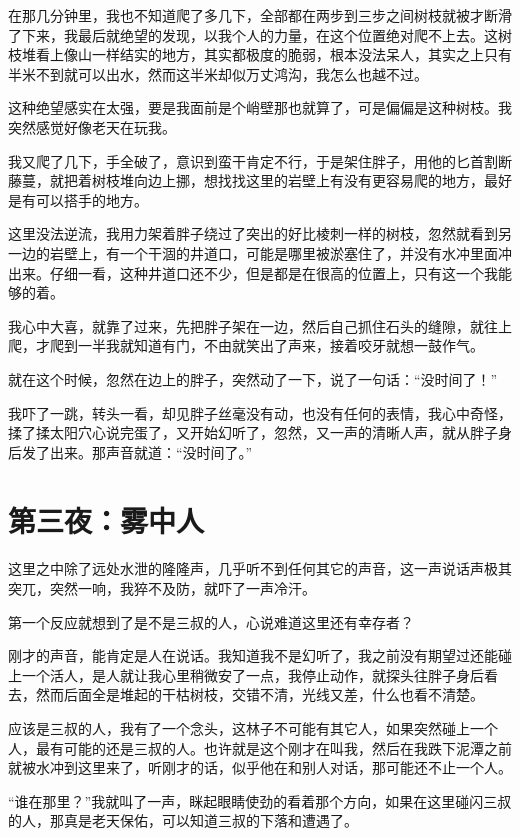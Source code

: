在那几分钟里，我也不知道爬了多几下，全部都在两步到三步之间树枝就被才断滑了下来，我最后就绝望的发现，以我个人的力量，在这个位置绝对爬不上去。这树枝堆看上像山一样结实的地方，其实都极度的脆弱，根本没法呆人，其实之上只有半米不到就可以出水，然而这半米却似万丈鸿沟，我怎么也越不过。

这种绝望感实在太强，要是我面前是个峭壁那也就算了，可是偏偏是这种树枝。我突然感觉好像老天在玩我。

我又爬了几下，手全破了，意识到蛮干肯定不行，于是架住胖子，用他的匕首割断藤蔓，就把着树枝堆向边上挪，想找找这里的岩壁上有没有更容易爬的地方，最好是有可以搭手的地方。

这里没法逆流，我用力架着胖子绕过了突出的好比棱刺一样的树枝，忽然就看到另一边的岩壁上，有一个干涸的井道口，可能是哪里被淤塞住了，并没有水冲里面冲出来。仔细一看，这种井道口还不少，但是都是在很高的位置上，只有这一个我能够的着。

我心中大喜，就靠了过来，先把胖子架在一边，然后自己抓住石头的缝隙，就往上爬，才爬到一半我就知道有门，不由就笑出了声来，接着咬牙就想一鼓作气。

就在这个时候，忽然在边上的胖子，突然动了一下，说了一句话：“没时间了！”

我吓了一跳，转头一看，却见胖子丝毫没有动，也没有任何的表情，我心中奇怪，揉了揉太阳穴心说完蛋了，又开始幻听了，忽然，又一声的清晰人声，就从胖子身后发了出来。那声音就道：“没时间了。”

\chapter{第三夜：雾中人}

这里之中除了远处水泄的隆隆声，几乎听不到任何其它的声音，这一声说话声极其突兀，突然一响，我猝不及防，就吓了一声冷汗。

第一个反应就想到了是不是三叔的人，心说难道这里还有幸存者？

刚才的声音，能肯定是人在说话。我知道我不是幻听了，我之前没有期望过还能碰上一个活人，是人就让我心里稍微安了一点，我停止动作，就探头往胖子身后看去，然而后面全是堆起的干枯树枝，交错不清，光线又差，什么也看不清楚。

应该是三叔的人，我有了一个念头，这林子不可能有其它人，如果突然碰上一个人，最有可能的还是三叔的人。也许就是这个刚才在叫我，然后在我跌下泥潭之前就被水冲到这里来了，听刚才的话，似乎他在和别人对话，那可能还不止一个人。

“谁在那里？”我就叫了一声，眯起眼睛使劲的看着那个方向，如果在这里碰闪三叔的人，那真是老天保佑，可以知道三叔的下落和遭遇了。

